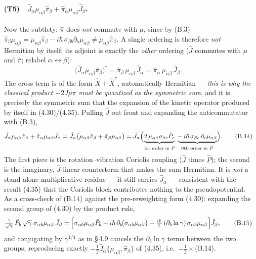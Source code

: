 \paragraph{(T5)\ \ $\hat J_\alpha\mu_{\alpha\beta}\hat\pi_\beta+\hat\pi_\alpha\mu_{\alpha\beta}\hat J_\beta$.}
Now the subtlety: $\hat\pi$ does \emph{not} commute with $\mu$, since by (B.3) $\hat\pi_\beta\mu_{\alpha\beta}=\mu_{\alpha\beta}\hat\pi_\beta-i\hbar\,\sigma_{\beta b}\partial_b\mu_{\alpha\beta}\neq\mu_{\alpha\beta}\hat\pi_\beta$. A single ordering is therefore \emph{not} Hermitian by itself; its adjoint is exactly the \emph{other} ordering ($\hat J$ commutes with $\mu$ and $\hat\pi$; relabel $\alpha\leftrightarrow\beta$):
\begin{equation}
\bigl(\hat J_\alpha\mu_{\alpha\beta}\hat\pi_\beta\bigr)^{\dagger}
=\hat\pi_\beta\,\mu_{\alpha\beta}\,\hat J_\alpha
=\hat\pi_\alpha\,\mu_{\alpha\beta}\,\hat J_\beta . \tag{B.13}
\end{equation}
The cross term is of the form $\hat X+\hat X^{\dagger}$, automatically Hermitian --- \emph{this is why the classical product $-2J\mu\pi$ must be quantized as the symmetric sum}, and it is precisely the symmetric sum that the expansion of the kinetic operator produced by itself in (4.30)/(4.35). Pulling $\hat J$ out front and expanding the anticommutator with (B.3),
\begin{equation}
\hat J_\alpha\mu_{\alpha\beta}\hat\pi_\beta+\hat\pi_\alpha\mu_{\alpha\beta}\hat J_\beta
=\hat J_\alpha\bigl(\mu_{\alpha\beta}\hat\pi_\beta+\hat\pi_\beta\mu_{\alpha\beta}\bigr)
=\hat J_\alpha\Bigl(\underbrace{2\,\mu_{\alpha\beta}\sigma_{\beta c}\hat P_c}_{\text{1st order in }\hat P}
\;\underbrace{-\,i\hbar\,\sigma_{\beta c}\,\partial_c\mu_{\alpha\beta}}_{\text{0th order in }\hat P}\Bigr). \tag{B.14}
\end{equation}
The first piece is the rotation--vibration Coriolis coupling ($\hat J$ times $\hat P$); the second is the imaginary, $\hat J$-linear counterterm that makes the sum Hermitian. It is \emph{not} a stand-alone multiplicative residue --- it still carries $\hat J_\alpha$ --- consistent with the result (4.35) that the Coriolis block contributes nothing to the pseudopotential. As a cross-check of (B.14) against the pre-reweighting form (4.30): expanding the second group of (4.30) by the product rule,
\begin{equation}
\tfrac{1}{\sqrt\gamma}\,\hat P_b\,\sqrt\gamma\;\sigma_{\alpha b}\mu_{\alpha\beta}\,\hat J_\beta
=\Bigl[\sigma_{\alpha b}\mu_{\alpha\beta}\hat P_b
-i\hbar\,\partial_b\!\bigl(\sigma_{\alpha b}\mu_{\alpha\beta}\bigr)
-\tfrac{i\hbar}{2}\,(\partial_b\ln\gamma)\,\sigma_{\alpha b}\mu_{\alpha\beta}\Bigr]\hat J_\beta , \tag{B.15}
\end{equation}
and conjugating by $\gamma^{1/4}$ as in \S\,4.9 cancels the $\partial_b\ln\gamma$ terms between the two groups, reproducing exactly $-\tfrac12\hat J_\alpha\{\mu_{\alpha\beta},\hat\pi_\beta\}$ of (4.35), i.e.\ $-\tfrac12\times$(B.14).

